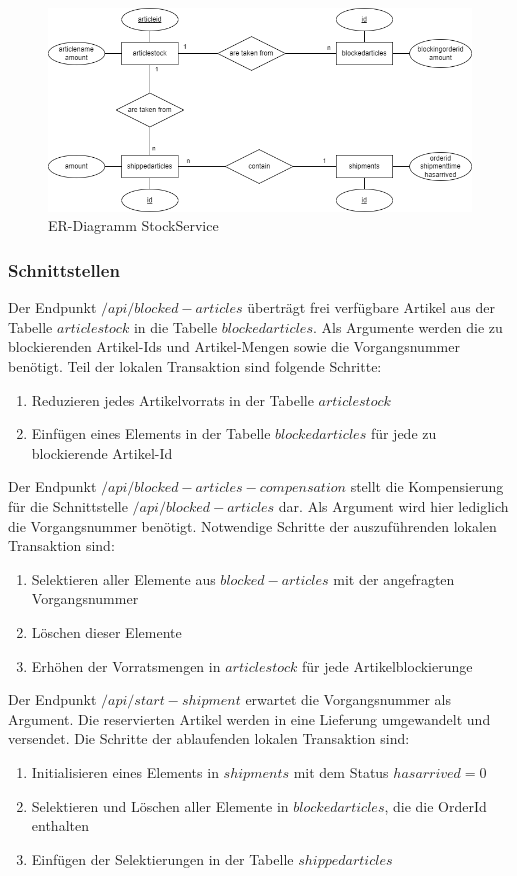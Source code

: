 \begin{figure}[h!]
	\centering
	\includegraphics[scale=0.5]{figures/DatabaseER/StockServiceTables.png}
	\caption{ER-Diagramm StockService}
\end{figure}
\FloatBarrier

\subsubsection{Schnittstellen}

Der Endpunkt $/api/blocked-articles$ überträgt frei verfügbare Artikel aus der Tabelle $articlestock$ in die Tabelle $blockedarticles$. Als Argumente werden die zu blockierenden Artikel-Ids und Artikel-Mengen sowie die Vorgangsnummer benötigt. Teil der lokalen Transaktion sind folgende Schritte:
\begin{enumerate}
	\item Reduzieren jedes Artikelvorrats in der Tabelle $articlestock$
	\item Einfügen eines Elements in der Tabelle $blockedarticles$ für jede zu blockierende Artikel-Id
\end{enumerate}

Der Endpunkt $/api/blocked-articles-compensation$ stellt die Kompensierung für die Schnittstelle $/api/blocked-articles$ dar. Als Argument wird hier lediglich die Vorgangsnummer benötigt. Notwendige Schritte der auszuführenden lokalen Transaktion sind:
\begin{enumerate}
	\item Selektieren aller Elemente aus $blocked-articles$ mit der angefragten Vorgangsnummer
	\item Löschen dieser Elemente
	\item Erhöhen der Vorratsmengen in $articlestock$ für jede Artikelblockierunge
\end{enumerate}

Der Endpunkt $/api/start-shipment$ erwartet die Vorgangsnummer als Argument. Die reservierten Artikel werden in eine Lieferung umgewandelt und versendet. Die Schritte der ablaufenden lokalen Transaktion sind:
\begin{enumerate}
	\item Initialisieren eines Elements in $shipments$ mit dem Status $hasarrived=0$
	\item Selektieren und Löschen aller Elemente in $blockedarticles$, die die OrderId enthalten
	\item Einfügen der Selektierungen in der Tabelle $shippedarticles$
\end{enumerate}

